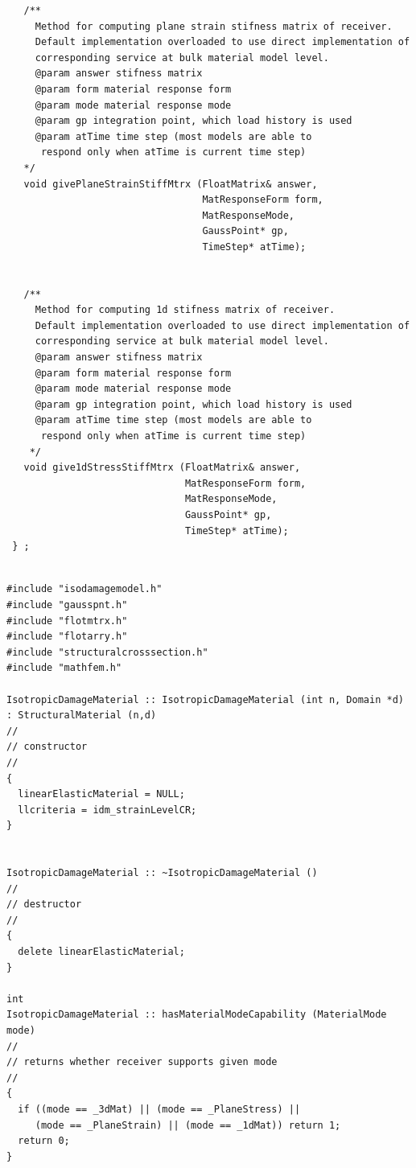 \documentclass[a4paper]{article}
\begin{document}
{\begin{verbatim}
   /**
     Method for computing plane strain stifness matrix of receiver.
     Default implementation overloaded to use direct implementation of 
     corresponding service at bulk material model level.
     @param answer stifness matrix
     @param form material response form
     @param mode material response mode
     @param gp integration point, which load history is used
     @param atTime time step (most models are able to 
      respond only when atTime is current time step)
   */
   void givePlaneStrainStiffMtrx (FloatMatrix& answer, 
                                  MatResponseForm form,
                                  MatResponseMode,
                                  GaussPoint* gp, 
                                  TimeStep* atTime);


   /**
     Method for computing 1d stifness matrix of receiver.
     Default implementation overloaded to use direct implementation of 
     corresponding service at bulk material model level.
     @param answer stifness matrix
     @param form material response form
     @param mode material response mode
     @param gp integration point, which load history is used
     @param atTime time step (most models are able to 
      respond only when atTime is current time step)
    */
   void give1dStressStiffMtrx (FloatMatrix& answer, 
                               MatResponseForm form,
                               MatResponseMode,
                               GaussPoint* gp,
                               TimeStep* atTime);
 } ;

 \end{verbatim}
 }

{\small
\begin{verbatim}

#include "isodamagemodel.h"
#include "gausspnt.h"
#include "flotmtrx.h"
#include "flotarry.h"
#include "structuralcrosssection.h"
#include "mathfem.h"

IsotropicDamageMaterial :: IsotropicDamageMaterial (int n, Domain *d)
: StructuralMaterial (n,d)
//
// constructor
//
{
  linearElasticMaterial = NULL;
  llcriteria = idm_strainLevelCR;
}


IsotropicDamageMaterial :: ~IsotropicDamageMaterial ()
//
// destructor
//
{
  delete linearElasticMaterial;
}

int
IsotropicDamageMaterial :: hasMaterialModeCapability (MaterialMode mode)
//
// returns whether receiver supports given mode
//
{
  if ((mode == _3dMat) || (mode == _PlaneStress) || 
     (mode == _PlaneStrain) || (mode == _1dMat)) return 1;
  return 0;
}
\end{verbatim}}
\end{document}

